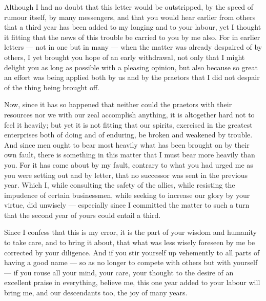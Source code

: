 

 Although I had no doubt that this letter would be outstripped, by the speed of rumour itself, by many messengers, and that you would hear earlier from others that a third year has been added to my longing and to your labour, yet I thought it fitting that the news of this trouble be carried to you by me also. For in earlier letters --- not in one but in many --- when the matter was already despaired of by others, I yet brought you hope of an early withdrawal, not only that I might delight you as long as possible with a pleasing opinion, but also because so great an effort was being applied both by us and by the praetors that I did not despair of the thing being brought off.

 Now, since it has so happened that neither could the praetors with their resources nor we with our zeal accomplish anything, it is altogether hard not to feel it heavily; but yet it is not fitting that our spirits, exercised in the greatest enterprises both of doing and of enduring, be broken and weakened by trouble. And since men ought to bear most heavily what has been brought on by their own fault, there is something in this matter that I must bear more heavily than you. For it has come about by my fault, contrary to what you had urged me as you were setting out and by letter, that no successor was sent in the previous year. Which I, while consulting the safety of the allies, while resisting the impudence of certain businessmen, while seeking to increase our glory by your virtue, did unwisely --- especially since I committed the matter to such a turn that the second year of yours could entail a third.

 Since I confess that this is my error, it is the part of your wisdom and humanity to take care, and to bring it about, that what was less wisely foreseen by me be corrected by your diligence. And if you stir yourself up vehemently to all parts of having a good name --- so as no longer to compete with others but with yourself --- if you rouse all your mind, your care, your thought to the desire of an excellent praise in everything, believe me, this one year added to your labour will bring me, and our descendants too, the joy of many years.

